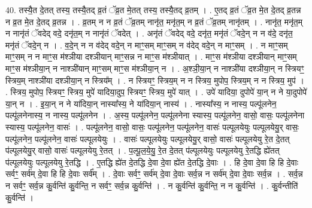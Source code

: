 \documentclass[17pt]{extarticle}
\begin{document}
40. तस्यै॒त दे॒तत् तस्य॒ तस्यै॒तद् व्र॒तं ॅव्र॒त मे॒तत् तस्य॒ तस्यै॒तद् व्र॒तम् । . ए॒तद् व्र॒तं ॅव्र॒त मे॒त दे॒तद् व्र॒तन्न न व्र॒त मे॒त दे॒तद् व्र॒तन्न । . व्र॒तम् न न व्र॒तं ॅव्र॒तम् नानृ॑त॒ मनृ॑त॒म् न व्र॒तं ॅव्र॒तम् नानृ॑तम् । . नानृ॑त॒ मनृ॑त॒म् न नानृ॑तं ॅवदेद् वदे॒ दनृ॑त॒म् न नानृ॑तं ॅवदेत् । . अनृ॑तं ॅवदेद् वदे॒ दनृ॑त॒ मनृ॑तं ॅवदे॒न् न न व॑दे॒ दनृ॑त॒ मनृ॑तं ॅवदे॒न् न । . व॒दे॒न् न न व॑देद् वदे॒न् न माꣳ॒॒सम् माꣳ॒॒सम् न व॑देद् वदे॒न् न माꣳ॒॒सम् । . न माꣳ॒॒सम् माꣳ॒॒सम् न न माꣳ॒॒स म॑श्ञीया दश्ञीयान् माꣳ॒॒सन्न न माꣳ॒॒स म॑श्ञीयात् । . माꣳ॒॒स म॑श्ञीया दश्ञीयान् माꣳ॒॒सम् माꣳ॒॒स म॑श्ञीया॒न् न नाश्ञी॑यान् माꣳ॒॒सम् माꣳ॒॒स म॑श्ञीया॒न् न । . अ॒श्ञी॒या॒न् न नाश्ञी॑या दश्ञीया॒न् न स्त्रियꣳ॒॒ स्त्रिय॒म् नाश्ञी॑या दश्ञीया॒न् न स्त्रिय᳚म् । . न स्त्रियꣳ॒॒ स्त्रिय॒म् न न स्त्रिय॒ मुपोप॒ स्त्रिय॒म् न न स्त्रिय॒ मुप॑ । . स्त्रिय॒ मुपोप॒ स्त्रियꣳ॒॒ स्त्रिय॒ मुपे॑ यादिया॒दुप॒ स्त्रियꣳ॒॒ स्त्रिय॒ मुपे॑ यात् । . उपे॑ यादिया॒ दुपोपे॑ या॒न् न ने या॒दुपोपे॑ या॒न् न । . इ॒या॒न् न ने या॑दिया॒न् नास्या᳚स्य॒ ने या॑दिया॒न् नास्य॑ । . नास्या᳚स्य॒ न नास्य॒ पल्पू॑लनेन॒ पल्पू॑लनेनास्य॒ न नास्य॒ पल्पू॑लनेन । . अ॒स्य॒ पल्पू॑लनेन॒ पल्पू॑लनेना स्यास्य॒ पल्पू॑लनेन॒ वासो॒ वासः॒ पल्पू॑लनेना स्यास्य॒ पल्पू॑लनेन॒ वासः॑ । . पल्पू॑लनेन॒ वासो॒ वासः॒ पल्पू॑लनेन॒ पल्पू॑लनेन॒ वासः॑ पल्पूलयेयुः पल्पूलयेयु॒र् वासः॒ पल्पू॑लनेन॒ पल्पू॑लनेन॒ वासः॑ पल्पूलयेयुः । . वासः॑ पल्पूलयेयुः पल्पूलयेयु॒र् वासो॒ वासः॑ पल्पूलयेयु रे॒त दे॒तत् प॑ल्पूलयेयु॒र् वासो॒ वासः॑ पल्पूलयेयु रे॒तत् । . प॒ल्पू॒ल॒ये॒यु॒ रे॒त दे॒तत् प॑ल्पूलयेयुः पल्पूलयेयु रे॒तद्धि ह्ये॑तत् प॑ल्पूलयेयुः पल्पूलयेयु रे॒तद्धि । . ए॒तद्धि ह्ये॑त दे॒तद्धि दे॒वा दे॒वा ह्ये॑त दे॒तद्धि दे॒वाः । . हि दे॒वा दे॒वा हि हि दे॒वाः सर्वꣳ॒॒ सर्व॑म् दे॒वा हि हि दे॒वाः सर्व᳚म् । . दे॒वाः सर्वꣳ॒॒ सर्व॑म् दे॒वा दे॒वाः सर्व॒न्न न सर्व॑म् दे॒वा दे॒वाः सर्व॒न्न । . सर्व॒न्न न सर्वꣳ॒॒ सर्व॒न्न कु॒र्वन्ति॑ कु॒र्वन्ति॒ न सर्वꣳ॒॒ सर्व॒न्न कु॒र्वन्ति॑ । . न कु॒र्वन्ति॑ कु॒र्वन्ति॒ न न कु॒र्वन्ति॑ । . कु॒र्वन्तीति॑ कु॒र्वन्ति॑ । \newline
\pagebreak
{}
\end{document}
